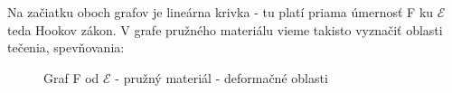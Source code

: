 \documentclass[11pt]{extarticle}
\newcommand{\Epsilon}{\mathcal{E}}
\begin{document}
Na začiatku oboch grafov je lineárna krivka - tu platí priama úmernosť F ku $\Epsilon$ teda Hookov zákon. V grafe pružného materiálu vieme takisto vyznačiť oblasti tečenia, spevňovania:\\

\newcommand{\vyznac}[2]{
\addplot[draw=none, fill=#2] table [
	col sep=comma,
	x expr=\thisrow{col6},
	y expr=\thisrow{col3},
	restrict expr to domain={\thisrow{col6}}{#1}
] {meranie-gumicka.csv} \closedcycle;
}


\begin{figure}[H]
	\centering
	\caption{Graf F od $\Epsilon$ - pružný materiál - deformačné oblasti}
\end{figure}
\end{document}
